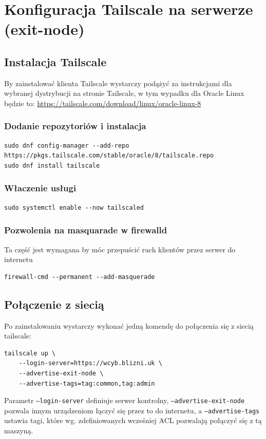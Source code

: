 \documentclass{report}
\numberwithin{equation}{section}
\begin{document}
\section{Konfiguracja Tailscale na serwerze (exit-node)}
\subsection{Instalacja Tailscale}
By zainstalować klienta Tailscale wystarczy podążyć za instrukcjami dla wybranej dystrybucji na stronie Tailscale, w tym wypadku dla Oracle Linux będzie to: \url{https://tailscale.com/download/linux/oracle-linux-8}
\subsubsection{Dodanie repozytoriów i instalacja}
\begin{verbatim}
sudo dnf config-manager --add-repo https://pkgs.tailscale.com/stable/oracle/8/tailscale.repo
sudo dnf install tailscale
\end{verbatim}
\subsubsection{Właczenie usługi}
\begin{verbatim}
sudo systemctl enable --now tailscaled
\end{verbatim}
\subsubsection{Pozwolenia na masquarade w firewalld}
Ta część jest wymagana by móc przepuścić ruch klientów przez serwer do internetu
\begin{verbatim}
firewall-cmd --permanent --add-masquerade
\end{verbatim}
\subsection{Połączenie z siecią}
Po zainstalowaniu wystarczy wykonać jedną komendę do połączenia się z siecią tailscale:
\begin{verbatim}
tailscale up \
    --login-server=https://wcyb.blizni.uk \
    --advertise-exit-node \
    --advertise-tags=tag:common,tag:admin
\end{verbatim}
Parametr \texttt{--login-server} definiuje serwer kontrolny, \texttt{--advertise-exit-node} pozwala innym urządzeniom łączyć się przez to do internetu, a \texttt{--advertise-tags} ustawia tagi, które wg. zdefiniowanych wcześniej ACL pozwalają połączyć się z tą maszyną.
\end{document}
